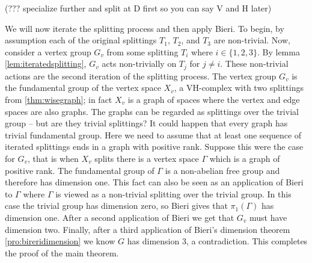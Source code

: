 \documentclass[12pt,parskip=full]{report}
\theoremstyle{plain}
\theoremstyle{definition}
\begin{document}
(??? specialize further and split at D first so you can say V and H later)

We will now iterate the splitting process and then apply Bieri. To begin, by assumption each of the original splittings \(T_1\), \(T_2\), and \(T_3\) are non-trivial. Now, consider a vertex group \(G_v\) from some splitting \(T_i\) where \(i\in \{1,2,3\}\). By lemma \ref{lem:iteratedsplitting}, \(G_v\) acts non-trivially on \(T_j\) for \(j\neq i\). These non-trivial actions are the second iteration of the splitting process. The vertex group \(G_v\) is the fundamental group of  the vertex space \(X_v\), a VH-complex with two splittings from \ref{thm:wisegraph}; in fact \(X_v\) is a graph of spaces where the vertex and edge spaces are also graphs. The graphs can be regarded as splittings over the trivial group -- but are they trivial splittings? It could happen that every graph has trivial fundamental group. Here we need to assume that at least one sequence of iterated splittings ends in a graph with positive rank. Suppose this were the case for \(G_v\), that is when \(X_v\) splits there is a vertex space \(\Gamma\) which is a graph of positive rank. The fundamental group of \(\Gamma\) is a non-abelian free group and therefore has dimension one. This fact can also be seen as an application of Bieri to \(\Gamma\) where \(\Gamma\) is viewed as a non-trivial splitting over the trivial group. In this case the trivial group has dimension zero, so Bieri gives that \(\pi_1(\Gamma)\) has dimension one. After a second application of Bieri we get that \(G_v\) must have dimension two. Finally, after a third application of Bieri's dimension theorem \ref{pro:bireridimension} we know \(G\) has dimension 3, a contradiction. This completes the proof of the main theorem.



\noindent

\cleardoublepage






\end{document}
